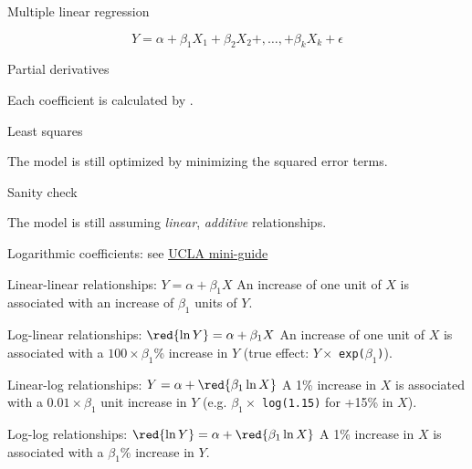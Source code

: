 \documentclass[t]{beamer}
\begin{document}
	\begin{frame}[c]{Multiple linear regression}
		
		$$Y = \alpha+\beta_1 X_1+\beta_2 X_2+,\ldots,+\beta_k X_k+\epsilon$$
		
		\vfill
		 
		\begin{block}{Partial derivatives}

			Each coefficient is calculated by .

		\end{block}

		\begin{block}{Least squares}

			The model is still optimized by minimizing the squared error terms.

		\end{block}

		\begin{alertblock}{Sanity check}

			The model is still assuming \emph{linear}, \emph{additive} relationships.

		\end{alertblock}
				
	\end{frame}

	\begin{frame}[c]{Logarithmic coefficients: see \href{http://www.ats.ucla.edu/stat/mult_pkg/faq/general/log_transformed_regression.htm}{UCLA mini-guide}}
	
		\begin{block}{Linear-linear relationships: $Y = \alpha + \beta_1 X$}
			An increase of one unit of $X$ is associated with an increase of $\beta_1$ units of $Y$.
		\end{block}
	
		\begin{block}{Log-linear relationships: $\red{\ln Y} = \alpha + \beta_1 X$}
			An increase of one unit of $X$ is associated with a $100 \times \beta_1$\% increase in $Y$ (true effect: $Y \times$ \texttt{exp($\beta_1$)}).
		\end{block}

		\begin{block}{Linear-log relationships: $Y = \alpha + \red{\beta_1 \ln X}$}
			A 1\% increase in $X$ is associated with a $0.01 \times \beta_1$ unit increase in $Y$ (e.g. $\beta_1 \times$ \texttt{log(1.15)} for +15\% in $X$).
		\end{block}
	
		\begin{block}{Log-log relationships: $\red{\ln Y} = \alpha + \red{\beta_1 \ln X}$}
			A 1\% increase in $X$ is associated with a $\beta_1$\% increase in $Y$.
		\end{block}
	
	\end{frame}
	
\end{document}

